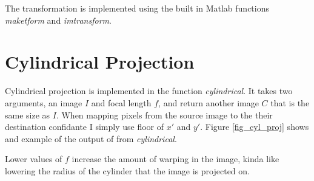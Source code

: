 \documentclass[12pt]{article}
\begin{document}
The transformation is implemented using the built in Matlab functions \textit{maketform} and \textit{imtransform}. 


\section{Cylindrical Projection}

Cylindrical projection is implemented in the function \textit{cylindrical}. It takes two arguments, an image $I$ and focal length $f$, and return another image $C$ that is the same size as $I$. When mapping pixels from the source image to the their destination confidante I simply use floor of $x'$ and $y'$. Figure \ref{fig_cyl_proj} shows and example of the output of from \textit{cylindrical}.

Lower values of $f$ increase the amount of warping in the image, kinda like lowering the radius of the cylinder that the image is projected on.
\end{document}
